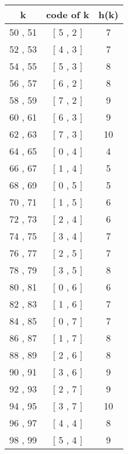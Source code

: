 \begin{center}
\begin{multicols}{3}
		\begin{tabular}{|c|c|c|}
			\hline
			\textbf{k} & \textbf{code of k} & \textbf{h(k)} \\
			\hline
			 50 , 51 & [ 5 , 2 ] & 7 \\
			 52 , 53 & [ 4 , 3 ] & 7 \\
			 54 , 55 & [ 5 , 3 ] & 8 \\
			 56 , 57 & [ 6 , 2 ] & 8 \\
			 58 , 59 & [ 7 , 2 ] & 9 \\
			 60 , 61 & [ 6 , 3 ] & 9 \\
			 62 , 63 & [ 7 , 3 ] & 10 \\
			 64 , 65 & [ 0 , 4 ] & 4 \\
			 66 , 67 & [ 1 , 4 ] & 5 \\
			 68 , 69 & [ 0 , 5 ] & 5 \\
			 70 , 71 & [ 1 , 5 ] & 6 \\
			 72 , 73 & [ 2 , 4 ] & 6 \\
			 74 , 75 & [ 3 , 4 ] & 7 \\
			 76 , 77 & [ 2 , 5 ] & 7 \\
			 78 , 79 & [ 3 , 5 ] & 8 \\
			 80 , 81 & [ 0 , 6 ] & 6 \\
			 82 , 83 & [ 1 , 6 ] & 7 \\
			 84 , 85 & [ 0 , 7 ] & 7 \\
			 86 , 87 & [ 1 , 7 ] & 8 \\
			 88 , 89 & [ 2 , 6 ] & 8 \\
			 90 , 91 & [ 3 , 6 ] & 9 \\
			 92 , 93 & [ 2 , 7 ] & 9 \\
			 94 , 95 & [ 3 , 7 ] & 10 \\
			 96 , 97 & [ 4 , 4 ] & 8 \\
			 98 , 99 & [ 5 , 4 ] & 9 \\
			\hline
		\end{tabular}
		

\end{multicols}
\end{center}
